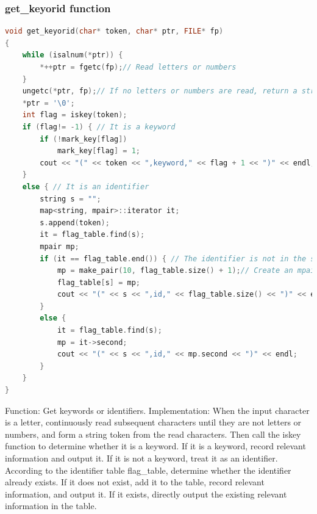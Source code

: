 \documentclass[a4paper,12pt]{article}
\begin{document}
\subsubsection{get\_keyorid function}
\begin{lstlisting}[language=c++]
void get_keyorid(char* token, char* ptr, FILE* fp)
{
    while (isalnum(*ptr)) {
        *++ptr = fgetc(fp);// Read letters or numbers
    }
    ungetc(*ptr, fp);// If no letters or numbers are read, return a string ending with \0, that is, a token
    *ptr = '\0';
    int flag = iskey(token);
    if (flag!= -1) { // It is a keyword
        if (!mark_key[flag])
            mark_key[flag] = 1;
        cout << "(" << token << ",keyword," << flag + 1 << ")" << endl;
    }
    else { // It is an identifier
        string s = "";
        map<string, mpair>::iterator it;
        s.append(token);
        it = flag_table.find(s);
        mpair mp;
        if (it == flag_table.end()) { // The identifier is not in the symbol table
            mp = make_pair(10, flag_table.size() + 1);// Create an mpair object
            flag_table[s] = mp;
            cout << "(" << s << ",id," << flag_table.size() << ")" << endl;
        }
        else {
            it = flag_table.find(s);
            mp = it->second;
            cout << "(" << s << ",id," << mp.second << ")" << endl;
        }
    }
}
\end{lstlisting}
Function: Get keywords or identifiers.
Implementation: When the input character is a letter, continuously read subsequent characters until they are not letters or numbers, and form a string token from the read characters. Then call the iskey function to determine whether it is a keyword. If it is a keyword, record relevant information and output it. If it is not a keyword, treat it as an identifier. According to the identifier table flag\_table, determine whether the identifier already exists. If it does not exist, add it to the table, record relevant information, and output it. If it exists, directly output the existing relevant information in the table.
\end{document}
